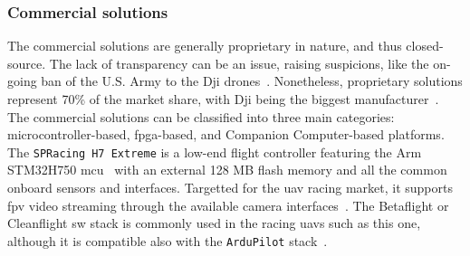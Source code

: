   

\subsubsection{Commercial solutions}%
\label{sec:commercial-solutions-hw}
The commercial solutions are generally proprietary in nature, and thus closed-source. The
lack of transparency can be an issue, raising suspicions, like the on-going ban
of the U.S. Army to the Dji
drones~\cite{suasNewsDjiDronesBanned2017,djiBan2022}. Nonetheless, proprietary
solutions represent 70\% of the market share, with Dji being the biggest
manufacturer~\cite{droneAnalyst2021}.
%
The commercial solutions can be classified into three main categories: microcontroller-based, \gls{fpga}-based, and Companion Computer-based
platforms.
The \lstinline{SPRacing H7 Extreme} is a low-end flight controller featuring the
Arm STM32H750 \gls{mcu}~\cite{spRacing}
with an external 128 MB flash
memory and all the common onboard sensors and interfaces. Targetted for the \gls{uav} racing market, it supports \gls{fpv} video
streaming through the available camera interfaces~\cite{spRacing}. The
Betaflight or Cleanflight \gls{sw} stack is commonly used in the racing
\glspl{uav} such as this one, although it is compatible also with the \lstinline{ArduPilot} stack~\cite{arduPilot-SPRacing}.

%  

